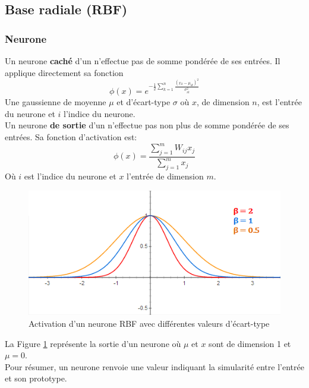 \subsection{Base radiale (RBF)}
\newcommand{\factnorm}{\sum_{r=1}^{m}x_{r}}
\subsubsection{Neurone}
Un neurone \textbf{caché} d'un \rbf n'effectue pas de somme pondérée de ses entrées. Il applique directement sa fonction
\[\phi(x) = e^{-\frac{1}{2}\sum_{k=1}^{n}\frac{(x_k-\mu_{ik})^2}{\sigma_{ik}^{2}}}\]
Une gaussienne de moyenne $\mu$ et d'écart-type $\sigma$ où $x$, de dimension $n$, est l'entrée du neurone et $i$ l'indice du neurone.
\\

Un neurone \textbf{de sortie} d'un \rbf n'effectue pas non plus de somme pondérée de ses entrées. Sa fonction d'activation est:
\[\phi(x) = \frac{\sum_{j=1}^{m}W_{ij}x_{j}}{\sum_{j=1}^{m}x_{j}}\]
Où $i$ est l'indice du neurone et $x$ l'entrée de dimension $m$.
\begin{figure}
 \centering
 \includegraphics[scale=0.7]{../figures/RBFactivation.png}
 \caption{Activation d'un neurone RBF avec différentes valeurs d'écart-type}
 \label{rbfactivation}
\end{figure}
La Figure \ref{rbfactivation} représente la sortie d'un neurone \rbf où $\mu$ et $x$ sont de dimension 1 et $\mu = 0$.\\
Pour résumer, un neurone \rbf renvoie une valeur indiquant la simularité entre l'entrée et son prototype.

